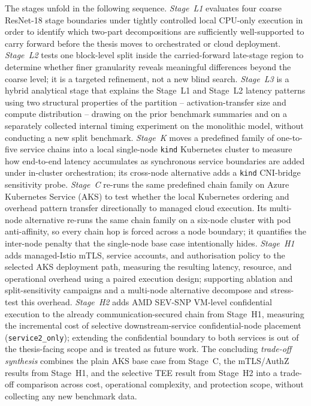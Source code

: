The stages unfold in the following sequence.
\emph{Stage~L1} evaluates four coarse ResNet-18 stage boundaries under tightly controlled
local CPU-only execution in order to identify which two-part decompositions are sufficiently 
well-supported to carry forward before the thesis moves to orchestrated or cloud deployment.
\emph{Stage~L2} tests one block-level split inside the carried-forward late-stage region to
determine whether finer granularity reveals meaningful differences beyond the coarse
level; it is a targeted refinement, not a new blind search.
\emph{Stage~L3} is a hybrid analytical stage that explains the Stage~L1 and Stage~L2 latency
patterns using two structural properties of the partition -- activation-transfer size and
compute distribution -- drawing on the prior benchmark summaries and on a separately
collected internal timing experiment on the monolithic model, without conducting a new
split benchmark.
\emph{Stage~K} moves a predefined family of one-to-five service chains into a local
single-node \texttt{kind} Kubernetes cluster to measure how end-to-end latency accumulates
as synchronous service boundaries are added under in-cluster orchestration; its
cross-node alternative adds a \texttt{kind} CNI-bridge sensitivity probe.
\emph{Stage~C} re-runs the same predefined chain family on Azure Kubernetes Service (AKS) to
test whether the local Kubernetes ordering and overhead pattern transfer directionally
to managed cloud execution. Its multi-node alternative re-runs the same chain family on a
six-node cluster with pod anti-affinity, so every chain hop is forced across a node
boundary; it quantifies the inter-node penalty that the single-node base case
intentionally hides.
\emph{Stage~H1} adds managed-Istio mTLS, service accounts, and authorisation policy to the
selected AKS deployment path, measuring the resulting latency, resource, and operational
overhead using a paired execution design; supporting ablation and split-sensitivity
campaigns and a multi-node alternative decompose and stress-test this overhead.
\emph{Stage~H2} adds AMD SEV-SNP VM-level confidential execution to the already
communication-secured chain from Stage~H1, measuring the incremental cost of selective
downstream-service confidential-node placement (\texttt{service2\_only}); extending the
confidential boundary to both services is out of the thesis-facing scope and is treated
as future work.
The concluding \emph{trade-off synthesis} combines the plain AKS base case from Stage~C, the
mTLS/AuthZ results from Stage~H1, and the selective TEE result from Stage~H2 into a
trade-off comparison across cost, operational complexity, and protection scope, without
collecting any new benchmark data.

